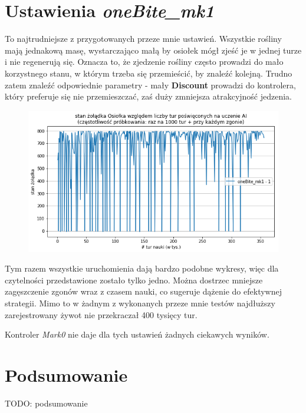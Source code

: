 \section{Ustawienia \textit{oneBite\_mk1}}
To najtrudniejsze z przygotowanych przeze mnie ustawień. Wszystkie rośliny mają jednakową masę, wystarczająco małą by osiołek mógł zjeść je w jednej turze i nie regenerują się. Oznacza to, że zjedzenie rośliny często prowadzi do mało korzystnego stanu, w którym trzeba się przemieścić, by znaleźć kolejną. Trudno zatem znaleźć odpowiednie parametry - mały \textbf{Discount} prowadzi do kontrolera, który preferuje się nie przemieszczać, zaś duży zmniejsza atrakcyjność jedzenia.
\begin{figure}[H]
    \centering
    \includegraphics[scale=0.6]{Chapters/oneBite_mk1}
\end{figure}
Tym razem wszystkie uruchomienia dają bardzo podobne wykresy, więc dla czytelności przedstawione zostało tylko jedno. Można dostrzec mniejsze zagęszczenie zgonów wraz z czasem nauki, co sugeruje dążenie do efektywnej strategii. Mimo to w żadnym z wykonanych przeze mnie testów najdłuższy zarejestrowany żywot nie przekraczał 400 tysięcy tur.

Kontroler \textit{Mark0} nie daje dla tych ustawień żadnych ciekawych wyników.

\section{Podsumowanie}
TODO: podsumowanie
